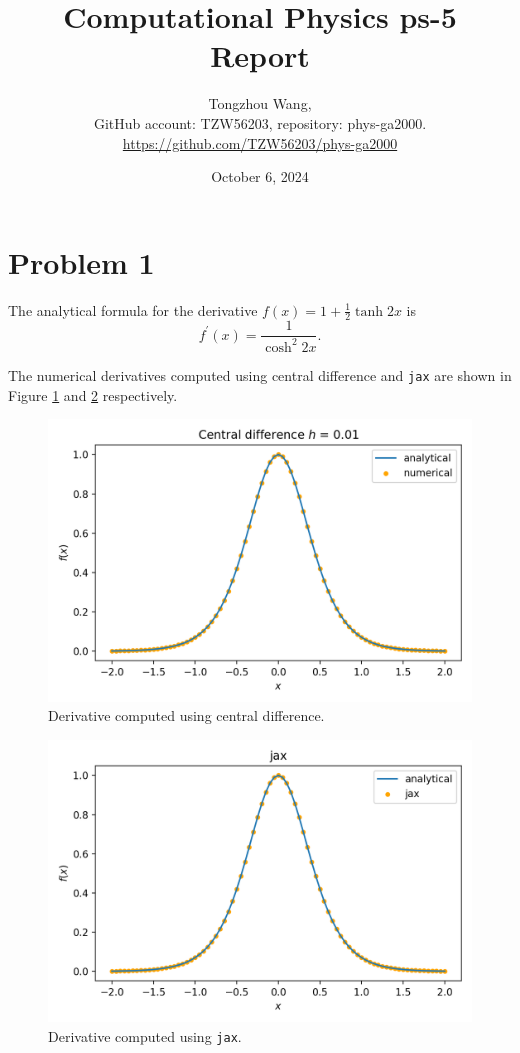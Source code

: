 \documentclass[11pt]{article}
\title{Computational Physics ps-5 Report}
\author{Tongzhou Wang, \\ GitHub account: TZW56203, repository: phys-ga2000. \\ \url{https://github.com/TZW56203/phys-ga2000}}
\date{October 6, 2024}
\begin{document}
\maketitle

\section{Problem 1}
The analytical formula for the derivative $f(x) = 1 + \frac{1}{2} \tanh 2x$ is 
\begin{equation}
    f^{\prime}(x) = \frac{1}{\cosh^{2}2x}.
\end{equation}

The numerical derivatives computed using central difference and \texttt{jax} are shown in Figure \ref{fig:central} and \ref{fig:jax} respectively.
\begin{figure}[H]
    \centering
    \includegraphics[scale = 0.8]{images/ps-5-1a.png}
    \caption{Derivative computed using central difference.}
    \label{fig:central}
\end{figure}
\begin{figure}[H]
    \centering
    \includegraphics[scale = 0.8]{images/ps-5-1b.png}
    \caption{Derivative computed using \texttt{jax}.}
    \label{fig:jax}
\end{figure}
\end{document}
